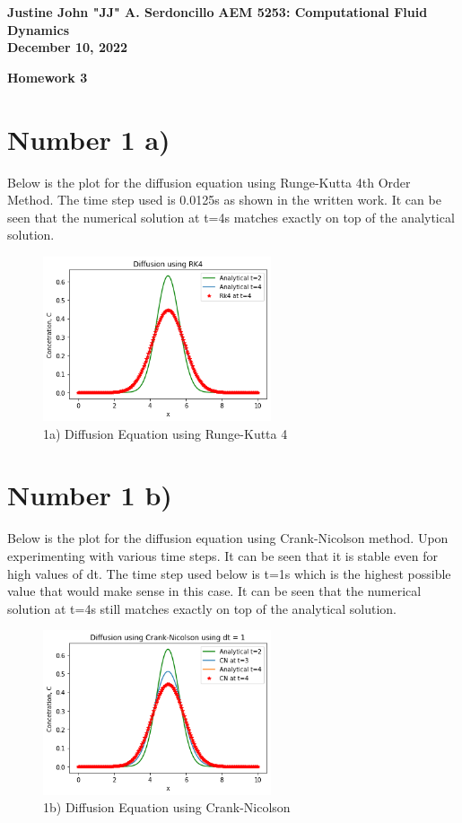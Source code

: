 \documentclass{article}
\begin{document}
	
	\noindent\textbf{Justine John "JJ" A. Serdoncillo}
	\hfill \textbf{AEM 5253: Computational Fluid Dynamics} \\ \hfill \textbf{December 10, 2022}
	
	\begin{center}
		\Large{\textbf{Homework 3}}    
	\end{center}
	
	\section*{Number 1 a)}
		Below is the plot for the diffusion equation using Runge-Kutta 4th Order Method. The time step used is 0.0125s as shown in the written work. It can be seen that the numerical solution at t=4s matches exactly on top of the analytical solution.

		\begin{figure}[H]
			\centering
			\includegraphics[width=0.6\textwidth]{images/rk4.png}
			\caption{\label{} 1a) Diffusion Equation using Runge-Kutta 4 }
		\end{figure}

	\section*{Number 1 b)}
		Below is the plot for the diffusion equation using Crank-Nicolson method. Upon experimenting with various time steps. It can be seen that it is stable even for high values of dt. The time step used below is t=1s which is the highest possible value that would make sense in this case. It can be seen that the numerical solution at t=4s still matches exactly on top of the analytical solution.
		
		\begin{figure}[H]
			\centering
			\includegraphics[width=0.6\textwidth]{images/cn.png}
			\caption{\label{} 1b) Diffusion Equation using Crank-Nicolson }
		\end{figure}
\end{document}
